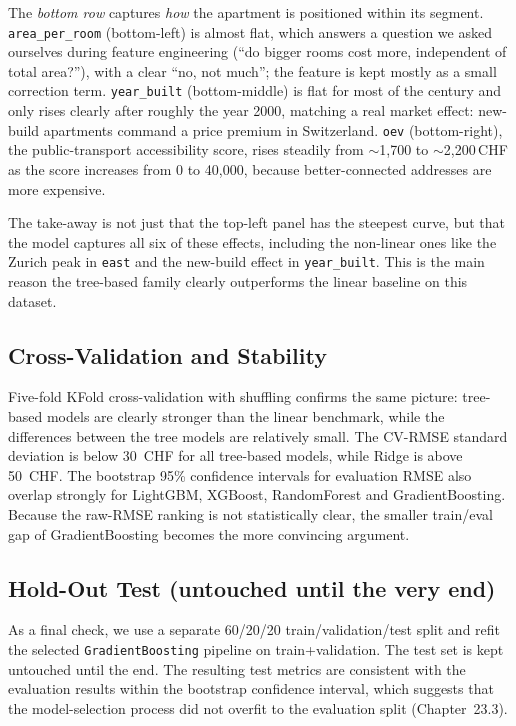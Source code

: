 \documentclass[11pt,a4paper]{article}
\begin{document}
The \emph{bottom row} captures \emph{how} the apartment is positioned within its segment. \texttt{area\_per\_room} (bottom-left) is almost flat, which answers a question we asked ourselves during feature engineering (``do bigger rooms cost more, independent of total area?''), with a clear ``no, not much''; the feature is kept mostly as a small correction term. \texttt{year\_built} (bottom-middle) is flat for most of the century and only rises clearly after roughly the year 2000, matching a real market effect: new-build apartments command a price premium in Switzerland. \texttt{oev} (bottom-right), the public-transport accessibility score, rises steadily from $\sim$1{,}700 to $\sim$2{,}200\,CHF as the score increases from 0 to 40{,}000, because better-connected addresses are more expensive.

The take-away is not just that the top-left panel has the steepest curve, but that the model captures all six of these effects, including the non-linear ones like the Zurich peak in \texttt{east} and the new-build effect in \texttt{year\_built}. This is the main reason the tree-based family clearly outperforms the linear baseline on this dataset.

\subsection{Cross-Validation and Stability}
Five-fold KFold cross-validation with shuffling confirms the same picture: tree-based models are clearly stronger than the linear benchmark, while the differences between the tree models are relatively small. The CV-RMSE standard deviation is below 30~CHF for all tree-based models, while Ridge is above 50~CHF. The bootstrap 95\% confidence intervals for evaluation RMSE also overlap strongly for LightGBM, XGBoost, RandomForest and GradientBoosting. Because the raw-RMSE ranking is not statistically clear, the smaller train/eval gap of GradientBoosting becomes the more convincing argument.

\subsection{Hold-Out Test (untouched until the very end)}
As a final check, we use a separate 60/20/20 train/validation/test split and refit the selected \texttt{GradientBoosting} pipeline on train+validation. The test set is kept untouched until the end. The resulting test metrics are consistent with the evaluation results within the bootstrap confidence interval, which suggests that the model-selection process did not overfit to the evaluation split (Chapter~23.3).
\end{document}
